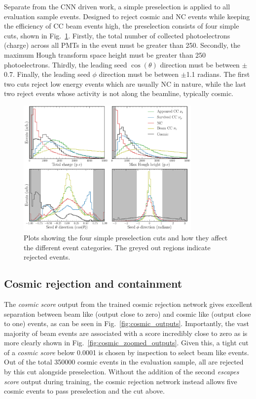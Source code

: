 Separate from the CNN driven work, a simple preselection is applied to all evaluation sample
events. Designed to reject cosmic and NC events while keeping the efficiency of CC beam events
high, the preselection consists of four simple cuts, shown in Fig.~\ref{fig:explore_simple_cuts}.
Firstly, the total number of collected photoelectrons (charge) across all PMTs in the event must
be greater than 250. Secondly, the maximum Hough transform space height must be greater than 250
photoelectrons. Thirdly, the leading seed $\cos(\theta)$ direction must be between $\pm$0.7.
Finally, the leading seed $\phi$ direction must be between $\pm$1.1 radians. The first two cuts
reject low energy events which are usually NC in nature, while the last two reject events whose
activity is not along the beamline, typically cosmic.

\begin{figure} %
    \includegraphics[width=0.8\textwidth]{diagrams/6-cvn/chipsnet/explore_simple_cuts.pdf}
    \caption[Plot detailing preselection cuts.]
    {Plots showing the four simple preselection cuts and how they affect the different event
        categories. The greyed out regions indicate rejected events.}
    \label{fig:explore_simple_cuts}
\end{figure}

\subsection{Cosmic rejection and containment} %
\label{sec:cvn_results_cosmic} %

The \emph{cosmic score} output from the trained cosmic rejection network gives excellent
separation between beam like (output close to zero) and cosmic like (output close to one) events,
as can be seen in Fig.~\ref{fig:cosmic_outputs}. Importantly, the vast majority of beam events are
associated with a score incredibly close to zero as is more clearly shown in
Fig.~\ref{fig:cosmic_zoomed_outputs}. Given this, a tight cut of a \emph{cosmic score} below
0.0001 is chosen by inspection to select beam like events. Out of the total 350000 cosmic events
in the evaluation sample, all are rejected by this cut alongside preselection. Without the
addition of the second \emph{escapes score} output during training, the cosmic rejection network
instead allows five cosmic events to pass preselection and the cut above.


